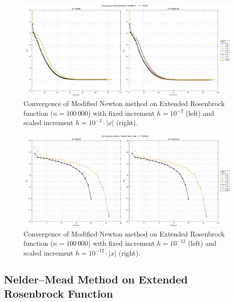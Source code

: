 \documentclass[a4paper,12pt]{article}
\begin{document}
	\newpage
	\begin{figure}[H]
		\centering
		\includegraphics[width=\textwidth]{../immagini/ext_100k_h2.png}
		\caption{Convergence of Modified Newton method on Extended Rosenbrock function ($n=100\,000$) with fixed increment $h = 10^{-2}$ (left) and scaled increment $h = 10^{-2}\cdot|x|$ (right).}
		\label{fig:fd_100k_h2}
	\end{figure}
	
	\begin{figure}[htbp]
		\centering
		\includegraphics[width=\textwidth]{../immagini/ext_100k_h12.png}
		\caption{Convergence of Modified Newton method on Extended Rosenbrock function ($n=100\,000$) with fixed increment $h = 10^{-12}$ (left) and scaled increment $h = 10^{-12}\cdot|x|$ (right).}
		\label{fig:fd_100k_h12}
	\end{figure}
	\newpage
	\subsection{Nelder–Mead Method on Extended Rosenbrock Function}
	
\end{document}

